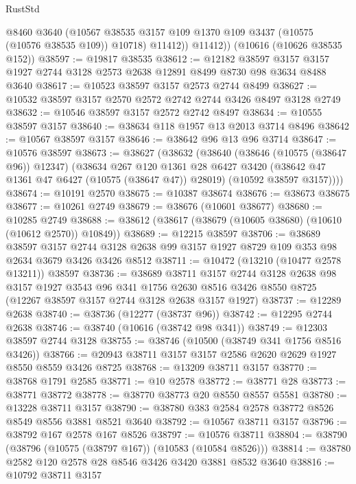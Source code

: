 \begin{lexlean}{RustStd}
\begin{coremodule}
            @8460
            @3640
            (@10567 @38535 @3157 @109 @1370 @109 @3437 (@10575 (@10576 @38535 @109)) @10718)
            @11412))
        @11412))
    (@10616 (@10626 @38535 @152))
@38597 := @19817 @38535
@38612 := @12182
    @38597
    @3157
    @3157
    @1927
    @2744
    @3128
    @2573
    @2638
    @12891
    @8499
    @8730
    @98
    @3634
    @8488
    @3640
@38617 := @10523 @38597 @3157 @2573 @2744 @8499
@38627 := @10532 @38597 @3157 @2570 @2572 @2742 @2744 @3426 @8497 @3128 @2749
@38632 := @10546 @38597 @3157 @2572 @2742 @8497
@38634 := @10555 @38597 @3157
@38640 := @38634 @118 @1957 @13 @2013 @3714 @8496
@38642 := @10567 @38597 @3157
@38646 := @38642 @96 @13 @96 @3714
@38647 := @10576 @38597
@38673 := @38627
    (@38632
      (@38640
        (@38646 (@10575 (@38647 @96)) @12347)
        (@38634
          @267
          @120
          @1361
          @28
          @6427
          @3420
          (@38642 @47 @1361 @47 @6427 (@10575 (@38647 @47)) @28019)
          (@10592 @38597 @3157))))
@38674 := @10191 @2570
@38675 := @10387 @38674
@38676 := @38673 @38675
@38677 := @10261 @2749
@38679 := @38676 (@10601 @38677)
@38680 := @10285 @2749
@38688 := @38612 (@38617 (@38679 (@10605 @38680) (@10610 (@10612 @2570)) @10849))
@38689 := @12215 @38597
@38706 := @38689
    @38597
    @3157
    @2744
    @3128
    @2638
    @99
    @3157
    @1927
    @8729
    @109
    @353
    @98
    @2634
    @3679
    @3426
    @3426
    @8512
@38711 := @10472 (@13210 (@10477 @2578 @13211)) @38597
@38736 := @38689
    @38711
    @3157
    @2744
    @3128
    @2638
    @98
    @3157
    @1927
    @3543
    @96
    @341
    @1756
    @2630
    @8516
    @3426
    @8550
    @8725
    (@12267 @38597 @3157 @2744 @3128 @2638 @3157 @1927)
@38737 := @12289 @2638
@38740 := @38736 (@12277 (@38737 @96))
@38742 := @12295 @2744 @2638
@38746 := @38740 (@10616 (@38742 @98 @341))
@38749 := @12303 @38597 @2744 @3128
@38755 := @38746 (@10500 (@38749 @341 @1756 @8516 @3426))
@38766 := @20943 @38711 @3157 @3157 @2586 @2620 @2629 @1927 @8550 @8559 @3426 @8725
@38768 := @13209 @38711 @3157
@38770 := @38768 @1791 @2585
@38771 := @10 @2578
@38772 := @38771 @28
@38773 := @38771 @38772
@38778 := @38770 @38773 @20 @8550 @8557 @5581
@38780 := @13228 @38711 @3157
@38790 := @38780 @383 @2584 @2578 @38772 @8526 @8549 @8556 @3881 @8521 @3640
@38792 := @10567 @38711 @3157
@38796 := @38792 @167 @2578 @167 @8526
@38797 := @10576 @38711
@38804 := @38790 (@38796 (@10575 (@38797 @167)) (@10583 (@10584 @8526)))
@38814 := @38780 @2582 @120 @2578 @28 @8546 @3426 @3420 @3881 @8532 @3640
@38816 := @10792 @38711 @3157

\end{coremodule}
\end{lexlean}
